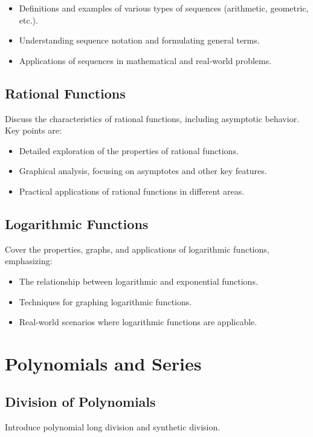 \documentclass[a4paper,12pt]{book}
\newcounter{problem}
\begin{document}
\begin{itemize}
    \item Definitions and examples of various types of sequences (arithmetic, geometric, etc.).
    \item Understanding sequence notation and formulating general terms.
    \item Applications of sequences in mathematical and real-world problems.
\end{itemize}


\subsection{Rational Functions}
\label{subsec:rational_functions_chapter}
Discuss the characteristics of rational functions, including asymptotic behavior. Key points are:


\begin{itemize}
    \item Detailed exploration of the properties of rational functions.
    \item Graphical analysis, focusing on asymptotes and other key features.
    \item Practical applications of rational functions in different areas.
\end{itemize}


\subsection{Logarithmic Functions}
\label{subsec:logarithmic_functions}
Cover the properties, graphs, and applications of logarithmic functions, emphasizing:


\begin{itemize}
    \item The relationship between logarithmic and exponential functions.
    \item Techniques for graphing logarithmic functions.
    \item Real-world scenarios where logarithmic functions are applicable.
\end{itemize}


\section{Polynomials and Series}
\label{sec:polynomials_and_series}


\subsection{Division of Polynomials}
\label{subsec:division_of_polynomials}
Introduce polynomial long division and synthetic division.
\end{document}
